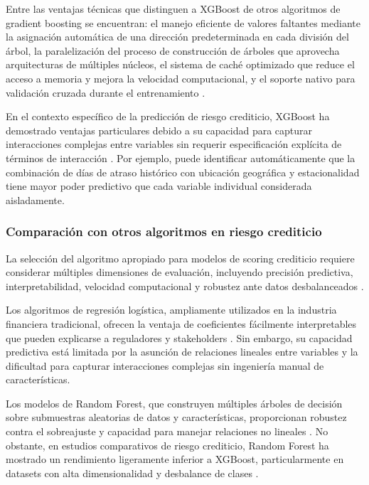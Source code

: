 Entre las ventajas técnicas que distinguen a XGBoost de otros algoritmos de gradient boosting se encuentran: el manejo eficiente de valores faltantes mediante la asignación automática de una dirección predeterminada en cada división del árbol, la paralelización del proceso de construcción de árboles que aprovecha arquitecturas de múltiples núcleos, el sistema de caché optimizado que reduce el acceso a memoria y mejora la velocidad computacional, y el soporte nativo para validación cruzada durante el entrenamiento \cite{chen2016xgboost}.

En el contexto específico de la predicción de riesgo crediticio, XGBoost ha demostrado ventajas particulares debido a su capacidad para capturar interacciones complejas entre variables sin requerir especificación explícita de términos de interacción \cite{lessmann2015benchmarking}. Por ejemplo, puede identificar automáticamente que la combinación de días de atraso histórico con ubicación geográfica y estacionalidad tiene mayor poder predictivo que cada variable individual considerada aisladamente.

\subsubsection{Comparación con otros algoritmos en riesgo crediticio}
La selección del algoritmo apropiado para modelos de scoring crediticio requiere considerar múltiples dimensiones de evaluación, incluyendo precisión predictiva, interpretabilidad, velocidad computacional y robustez ante datos desbalanceados \cite{lessmann2015benchmarking}.

Los algoritmos de regresión logística, ampliamente utilizados en la industria financiera tradicional, ofrecen la ventaja de coeficientes fácilmente interpretables que pueden explicarse a reguladores y stakeholders \cite{baesens2003benchmarking}. Sin embargo, su capacidad predictiva está limitada por la asunción de relaciones lineales entre variables y la dificultad para capturar interacciones complejas sin ingeniería manual de características.

Los modelos de Random Forest, que construyen múltiples árboles de decisión sobre submuestras aleatorias de datos y características, proporcionan robustez contra el sobreajuste y capacidad para manejar relaciones no lineales \cite{breiman2001random}. No obstante, en estudios comparativos de riesgo crediticio, Random Forest ha mostrado un rendimiento ligeramente inferior a XGBoost, particularmente en datasets con alta dimensionalidad y desbalance de clases \cite{lessmann2015benchmarking}.

